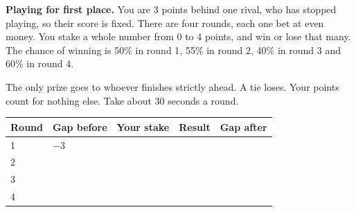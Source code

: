 \begin{question}\label{iq:iv2:played-games:12}
\textbf{Playing for first place.} You are 3 points behind one rival, who has stopped playing, so their score is fixed. There are four rounds, each one bet at even money. You stake a whole number from 0 to 4 points, and win or lose that many. The chance of winning is 50\% in round 1, 55\% in round 2, 40\% in round 3 and 60\% in round 4.

The only prize goes to whoever finishes strictly ahead. A tie loses. Your points count for nothing else. Take about 30 seconds a round.

\medskip
\begin{tabular}{@{}l|l|l|l|l@{}}
Round & Gap before & Your stake & Result & Gap after \\ \hline
1 & $-3$ & & & \\[8pt]\hline
2 & & & & \\[8pt]\hline
3 & & & & \\[8pt]\hline
4 & & & & \\[8pt]\hline
\end{tabular}
\end{question}
